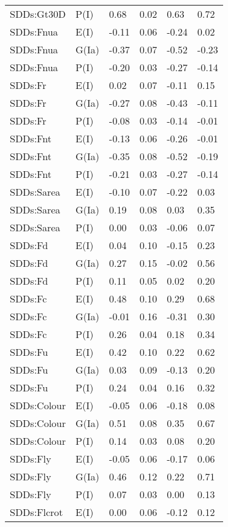 \begin{center}
\begin{longtable}{|p{1.1in}|p{0.7in}|p{0.7in}|p{0.6in}|p{0.6in}|p{0.6in}|}
  SDDs:Gt30D & P(I) & 0.68 & 0.02 & 0.63 & 0.72 \\ 
  SDDs:Fnua & E(I) & -0.11 & 0.06 & -0.24 & 0.02 \\ 
  SDDs:Fnua & G(Ia) & -0.37 & 0.07 & -0.52 & -0.23 \\ 
  SDDs:Fnua & P(I) & -0.20 & 0.03 & -0.27 & -0.14 \\ 
  SDDs:Fr & E(I) & 0.02 & 0.07 & -0.11 & 0.15 \\ 
  SDDs:Fr & G(Ia) & -0.27 & 0.08 & -0.43 & -0.11 \\ 
  SDDs:Fr & P(I) & -0.08 & 0.03 & -0.14 & -0.01 \\ 
  SDDs:Fnt & E(I) & -0.13 & 0.06 & -0.26 & -0.01 \\ 
  SDDs:Fnt & G(Ia) & -0.35 & 0.08 & -0.52 & -0.19 \\ 
  SDDs:Fnt & P(I) & -0.21 & 0.03 & -0.27 & -0.14 \\ 
  SDDs:Sarea & E(I) & -0.10 & 0.07 & -0.22 & 0.03 \\ 
  SDDs:Sarea & G(Ia) & 0.19 & 0.08 & 0.03 & 0.35 \\ 
  SDDs:Sarea & P(I) & 0.00 & 0.03 & -0.06 & 0.07 \\ 
  SDDs:Fd & E(I) & 0.04 & 0.10 & -0.15 & 0.23 \\ 
  SDDs:Fd & G(Ia) & 0.27 & 0.15 & -0.02 & 0.56 \\ 
  SDDs:Fd & P(I) & 0.11 & 0.05 & 0.02 & 0.20 \\ 
  SDDs:Fc & E(I) & 0.48 & 0.10 & 0.29 & 0.68 \\ 
  SDDs:Fc & G(Ia) & -0.01 & 0.16 & -0.31 & 0.30 \\ 
  SDDs:Fc & P(I) & 0.26 & 0.04 & 0.18 & 0.34 \\ 
  SDDs:Fu & E(I) & 0.42 & 0.10 & 0.22 & 0.62 \\ 
  SDDs:Fu & G(Ia) & 0.03 & 0.09 & -0.13 & 0.20 \\ 
  SDDs:Fu & P(I) & 0.24 & 0.04 & 0.16 & 0.32 \\ 
  SDDs:Colour & E(I) & -0.05 & 0.06 & -0.18 & 0.08 \\ 
  SDDs:Colour & G(Ia) & 0.51 & 0.08 & 0.35 & 0.67 \\ 
  SDDs:Colour & P(I) & 0.14 & 0.03 & 0.08 & 0.20 \\ 
  SDDs:Fly & E(I) & -0.05 & 0.06 & -0.17 & 0.06 \\ 
  SDDs:Fly & G(Ia) & 0.46 & 0.12 & 0.22 & 0.71 \\ 
  SDDs:Fly & P(I) & 0.07 & 0.03 & 0.00 & 0.13 \\ 
  SDDs:Flcrot & E(I) & 0.00 & 0.06 & -0.12 & 0.12 \\ 

\end{longtable}
\end{center}

